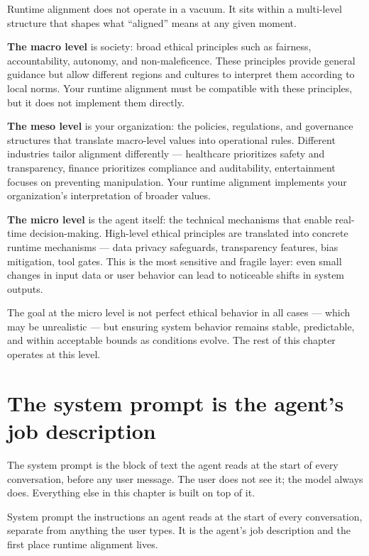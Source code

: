 Runtime alignment does not operate in a vacuum. It sits within a multi-level structure that shapes what ``aligned'' means at any given moment.

\textbf{The macro level} is society: broad ethical principles such as fairness, accountability, autonomy, and non-maleficence. These principles provide general guidance but allow different regions and cultures to interpret them according to local norms. Your runtime alignment must be compatible with these principles, but it does not implement them directly.

\textbf{The meso level} is your organization: the policies, regulations, and governance structures that translate macro-level values into operational rules. Different industries tailor alignment differently --- healthcare prioritizes safety and transparency, finance prioritizes compliance and auditability, entertainment focuses on preventing manipulation. Your runtime alignment implements your organization's interpretation of broader values.

\textbf{The micro level} is the agent itself: the technical mechanisms that enable real-time decision-making. High-level ethical principles are translated into concrete runtime mechanisms --- data privacy safeguards, transparency features, bias mitigation, tool gates. This is the most sensitive and fragile layer: even small changes in input data or user behavior can lead to noticeable shifts in system outputs.

The goal at the micro level is not perfect ethical behavior in all cases --- which may be unrealistic --- but ensuring system behavior remains stable, predictable, and within acceptable bounds as conditions evolve. The rest of this chapter operates at this level.

\section{The system prompt is the agent's job description}

The system prompt is the block of text the agent reads at the start of every conversation, before any user message. The user does not see it; the model always does. Everything else in this chapter is built on top of it.

\begin{TNdefinition}{System prompt} the instructions an agent reads at the start of every conversation, separate from anything the user types. It is the agent's job description and the first place runtime alignment lives. \end{TNdefinition}

